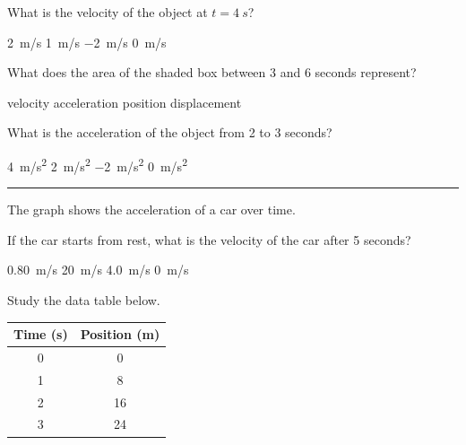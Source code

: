 \documentclass[]{exam}
\begin{document}
\begin{questions}
\question \label{rruYR}
What is the velocity of the object at $t = \SI{4}{s}$?

\begin{randomizechoices}
    \correctchoice \SI{2}{m/s}
    \choice \SI{1}{m/s}
    \choice \SI{-2}{m/s}
    \choice \SI{0}{m/s}
\end{randomizechoices}

\question
What does the area of the shaded box between 3 and 6 seconds represent?

\begin{randomizechoices}
    \choice velocity
    \choice acceleration
    \choice position
    \correctchoice displacement
\end{randomizechoices}

\question \label{ynGeg}
What is the acceleration of the object from 2 to 3 seconds?

\begin{randomizechoices}
    \correctchoice \SI{4}{m/s^2}
    \choice \SI{2}{m/s^2}
    \choice \SI{-2}{m/s^2}
    \choice \SI{0}{m/s^2}
\end{randomizechoices}

\bigskip
\hrule

\question
The graph shows the acceleration of a car over time. 

\begin{center}
\end{center}

If the car starts from rest, what is the velocity of the car after 5
seconds?

\begin{randomizechoices}
    \choice \SI{0.80}{m/s}
    \correctchoice \SI{20}{m/s}
    \choice \SI{4.0}{m/s}
    \choice \SI{0}{m/s}
\end{randomizechoices}

\question
Study the data table below.

\begin{center}
    \begin{tabular}{c|c}
        \textbf{Time} (s) & \textbf{Position} (m) \\ \hline
         0 & 0 \\
         1 & 8 \\
         2 & 16 \\
         3 & 24 \\
    \end{tabular}
\end{center}


\end{questions}
\end{document}
